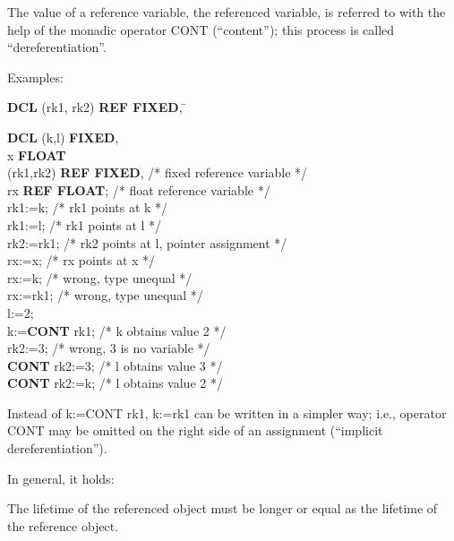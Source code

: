 The value of a reference variable, the referenced variable, is referred
to with the help of the monadic operator CONT (``content''); this
process is called ``dereferentiation''.

Examples:

\begin{tabbing}
{\bf DCL} (rk1, rk2) {\bf REF FIXED}, \= \kill

{\bf DCL} (k,l) {\bf FIXED}, \> \\
\x        x {\bf FLOAT}      \> \\
\x        (rk1,rk2) {\bf REF FIXED}, \> /* fixed reference variable */ \\
\x        rx {\bf REF FLOAT}; \> /* float reference variable */ \\
rk1:=k;   \> /* rk1 points at k */ \\
rk1:=l;   \> /* rk1 points at l */ \\
rk2:=rk1; \> /* rk2 points at l, pointer assignment */ \\
rx:=x;    \> /* rx points at x */ \\
rx:=k;    \> /* wrong, type unequal */ \\
rx:=rk1;  \> /* wrong, type unequal */ \\
l:=2;     \> \\
k:={\bf CONT} rk1; \> /* k obtains value 2 */ \\
rk2:=3;   \> /* wrong, 3 is no variable */ \\
{\bf CONT} rk2:=3; \> /* l obtains value 3 */ \\
{\bf CONT} rk2:=k; \> /* l obtains value 2 */ \\
\end{tabbing}

Instead of k:=CONT rk1, k:=rk1 can be written in a simpler way; i.e.,
operator CONT may be omitted on the right side of an assignment
(``implicit dereferentiation'').

In general, it holds:




The lifetime of the referenced object must be longer or equal as
the lifetime of the reference object.

